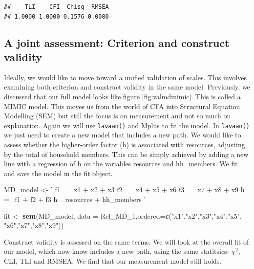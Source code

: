 \documentclass[]{book}
\newenvironment{Shaded}{\begin{snugshade}}{\end{snugshade}}
\newcommand{\DataTypeTok}[1]{\textcolor[rgb]{0.13,0.29,0.53}{#1}}
\newcommand{\DecValTok}[1]{\textcolor[rgb]{0.00,0.00,0.81}{#1}}
\newcommand{\KeywordTok}[1]{\textcolor[rgb]{0.13,0.29,0.53}{\textbf{#1}}}
\newcommand{\NormalTok}[1]{#1}
\newcommand{\StringTok}[1]{\textcolor[rgb]{0.31,0.60,0.02}{#1}}
\begin{document}
\begin{verbatim}
##    TLI    CFI  Chisq  RMSEA 
## 1.0000 1.0000 0.1576 0.0080
\end{verbatim}

\hypertarget{a-joint-assessment-criterion-and-construct-validity}{%
\subsection{A joint assessment: Criterion and construct validity}\label{a-joint-assessment-criterion-and-construct-validity}}

Ideally, we would like to move toward a unified validation of scales. This involves examining both criterion and construct validity in the same model. Previously, we discussed that our full model looks like figure \ref{fig:valmdmimic}. This is called a MIMIC model. This moves us from the world of CFA into Structural Equation Modelling (SEM) but still the focus is on measurement and not so much on explanation. Again we will use \texttt{lavaan()} and Mplus to fit the model. In \texttt{lavaan()} we just need to create a new model that includes a new path. We would like to assess whether the higher-order factor (h) is associated with resources, adjusting by the total of household members. This can be simply achieved by adding a new line with a regression of h on the variables resources and hh\_members. We fit and save the model in the fit object.

\begin{Shaded}
\begin{Highlighting}[]
\NormalTok{MD_model <-}\StringTok{ ' f1  =~ x1 + x2 + x3}
\StringTok{              f2 =~ x4 + x5 + x6}
\StringTok{              f3   =~ x7 + x8 + x9}
\StringTok{               h =~ f1 + f2 + f3}
\StringTok{               h ~ resources + hh_members}
\StringTok{'}

\NormalTok{fit <-}\StringTok{ }\KeywordTok{sem}\NormalTok{(MD_model,}
           \DataTypeTok{data =}\NormalTok{ Rel_MD_}\DecValTok{1}\NormalTok{,}\DataTypeTok{ordered=}\KeywordTok{c}\NormalTok{(}\StringTok{"x1"}\NormalTok{,}\StringTok{"x2"}\NormalTok{,}\StringTok{"x3"}\NormalTok{,}\StringTok{"x4"}\NormalTok{,}\StringTok{"x5"}\NormalTok{,}
                                     \StringTok{"x6"}\NormalTok{,}\StringTok{"x7"}\NormalTok{,}\StringTok{"x8"}\NormalTok{,}\StringTok{"x9"}\NormalTok{))}
\end{Highlighting}
\end{Shaded}

Construct validity is assessed on the same terms. We will look at the overall fit of our model, which now know includes a new path, using the same statitsics: \(\chi^2\), CLI, TLI and RMSEA. We find that our measurement model still holds.
\end{document}

